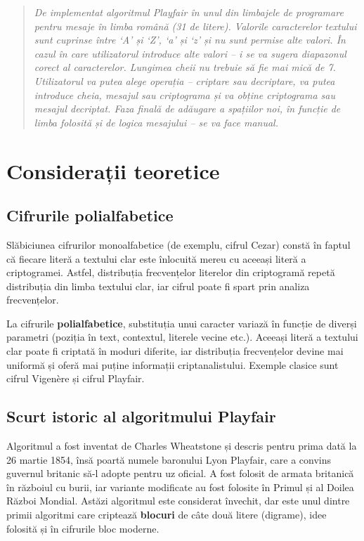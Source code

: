 \documentclass[12pt,a4paper]{article}
\begin{document}
\begin{quote}
\itshape
De implementat algoritmul Playfair în unul din limbajele de programare pentru
mesaje în limba română (31 de litere). Valorile caracterelor textului sunt cuprinse
între `A' și `Z', `a' și `z' și nu sunt permise alte valori. În cazul în care
utilizatorul introduce alte valori -- i se va sugera diapazonul corect al
caracterelor. Lungimea cheii nu trebuie să fie mai mică de 7. Utilizatorul va putea
alege operația -- criptare sau decriptare, va putea introduce cheia, mesajul sau
criptograma și va obține criptograma sau mesajul decriptat. Faza finală de adăugare
a spațiilor noi, în funcție de limba folosită și de logica mesajului -- se va face
manual.
\end{quote}

\section{Considerații teoretice}

\subsection{Cifrurile polialfabetice}

Slăbiciunea cifrurilor monoalfabetice (de exemplu, cifrul Cezar) constă în faptul
că fiecare literă a textului clar este înlocuită mereu cu aceeași literă a
criptogramei. Astfel, distribuția frecvențelor literelor din criptogramă repetă
distribuția din limba textului clar, iar cifrul poate fi spart prin analiza
frecvențelor.

La cifrurile \textbf{polialfabetice}, substituția unui caracter variază în funcție
de diverși parametri (poziția în text, contextul, literele vecine etc.). Aceeași
literă a textului clar poate fi criptată în moduri diferite, iar distribuția
frecvențelor devine mai uniformă și oferă mai puține informații criptanalistului.
Exemple clasice sunt cifrul Vigenère și cifrul Playfair.

\subsection{Scurt istoric al algoritmului Playfair}

Algoritmul a fost inventat de Charles Wheatstone și descris pentru prima dată la
26 martie 1854, însă poartă numele baronului Lyon Playfair, care a convins guvernul
britanic să-l adopte pentru uz oficial. A fost folosit de armata britanică în
războiul cu burii, iar variante modificate au fost folosite în Primul și al Doilea
Război Mondial. Astăzi algoritmul este considerat învechit, dar este unul dintre
primii algoritmi care criptează \textbf{blocuri} de câte două litere (digrame),
idee folosită și în cifrurile bloc moderne.
\end{document}
